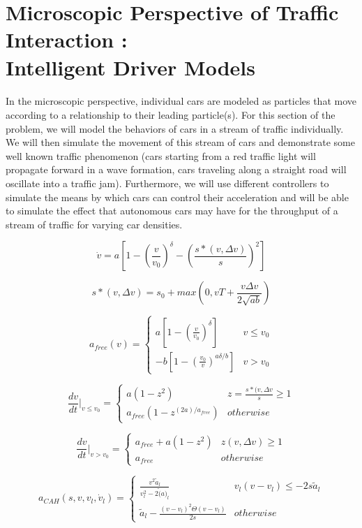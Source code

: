 \documentclass[11pt]{article}
\begin{document}
\section{Microscopic Perspective of Traffic Interaction : \\Intelligent Driver Models}
\paragraph{}In the microscopic perspective, individual cars are modeled as particles that move according to a relationship to their leading particle(s).
For this section of the problem, we will model the behaviors of cars in a stream of traffic individually. We will then simulate the movement of this stream of cars and demonstrate some well known traffic phenomenon (cars starting from a red traffic light will propagate forward in a wave formation, cars traveling along a straight road will oscillate into a traffic jam). Furthermore, we will use different controllers to simulate the means by which cars can control their acceleration and will be able to simulate the effect that autonomous cars may have for the throughput of a stream of traffic for varying car densities. 

$$\dot{v} = a \left[1 - \left(\frac{v}{v_0}\right)^{\delta} - \left(\frac{s*(v,\Delta v)}{s}\right)^{2}\right]$$

$$s*(v, \Delta v) = s_0 + max\left(0, vT + \frac{v \Delta v}{2 \sqrt{ab}} \right)$$

$$a_{free}(v)= \begin{cases}
a \left[ 1 - (\frac{v}{v_0})^\delta \right] & v \le v_0\\
-b \left[ 1 - (\frac{v_0}{v})^{a\delta/b} \right]& v > v_0
\end{cases}$$

$$\frac{dv}{dt}\Bigr|_{v\le v_0}= \begin{cases}
a (1-z^2) & z = \frac{s*(v, \Delta v}{s} \ge 1\\
a_{free}(1 - z^{(2a)/a_{free}})& otherwise
\end{cases}$$

$$\frac{dv}{dt}\Bigr|_{v> v_0}= \begin{cases}
a_{free} + a (1-z^2) & z(v, \Delta v) \ge 1\\
a_{free} & otherwise
\end{cases}$$

$$a_{CAH}(s,v,v_l, \dot{v}_l)= \begin{cases}
\frac{v^2\tilde{a}_l}{v_l^2 - 2 \tilde(a)_l} & v_l(v-v_l) \le -2s\tilde{a}_l\\
\tilde{a}_l - \frac{(v-v_l)^2 \Theta (v-v_l)}{2s} & otherwise
\end{cases}$$
\end{document}
